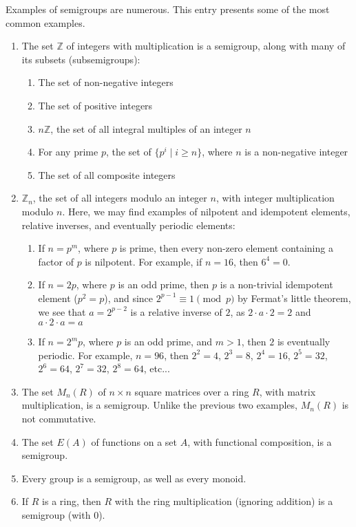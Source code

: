 \documentclass[12pt]{article}
\begin{document}
Examples of semigroups are numerous.  This entry presents some of the most common examples.

\begin{enumerate}
\item The set $\mathbb{Z}$ of integers with multiplication is a semigroup, along with many of its subsets (subsemigroups):
\begin{enumerate}
\item The set of non-negative integers
\item The set of positive integers
\item $n\mathbb{Z}$, the set of all integral multiples of an integer $n$
\item For any prime $p$, the set of $\lbrace p^i\mid i\ge n\rbrace$, where $n$ is a non-negative integer
\item The set of all composite integers
\end{enumerate}
\item $\mathbb{Z}_n$, the set of all integers modulo an integer $n$, with integer multiplication modulo $n$.  Here, we may find examples of nilpotent and idempotent elements, relative inverses, and eventually periodic elements:
\begin{enumerate}
\item If $n=p^m$, where $p$ is prime, then every non-zero element containing a factor of $p$ is nilpotent.  For example, if $n=16$, then $6^4=0$.
\item If $n=2p$, where $p$ is an odd prime, then $p$ is a non-trivial idempotent element ($p^2=p$), and since $2^{p-1}\equiv 1 \pmod p$ by Fermat's little theorem, we see that $a=2^{p-2}$ is a relative inverse of $2$, as $2\cdot a \cdot 2 = 2$ and $a\cdot 2 \cdot a=a$
\item If $n=2^m p$, where $p$ is an odd prime, and $m>1$, then $2$ is eventually periodic.  For example, $n=96$, then $2^2=4$, $2^3=8$, $2^4=16$, $2^5=32$, $2^6=64$, $2^7=32$, $2^8=64$, etc...
\end{enumerate}
\item The set $M_n(R)$ of $n\times n$ square matrices over a ring $R$, with matrix multiplication, is a semigroup.  Unlike the previous two examples, $M_n(R)$ is not commutative.
\item The set $E(A)$ of functions on a set $A$, with functional composition, is a semigroup.
\item Every group is a semigroup, as well as every monoid.
\item If $R$ is a ring, then $R$ with the ring multiplication (ignoring addition) is a semigroup (with $0$).

\end{enumerate}
\end{document}
